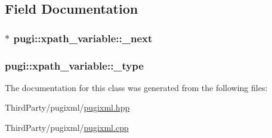 \subsection{Field Documentation}
\hypertarget{classpugi_1_1xpath__variable_a0979cb72473e77a1b6d213046abfc46e}{
\subsubsection[{\-\_\-next}]{$\ast$ pugi\-::xpath\-\_\-variable\-::\-\_\-next\hspace{0.3cm}{\ttfamily [protected]}}}\label{classpugi_1_1xpath__variable_a0979cb72473e77a1b6d213046abfc46e}
\hypertarget{classpugi_1_1xpath__variable_aefb30100ab8bf3cf2ba623dd6ffbbd35}{
\subsubsection[{\-\_\-type}]{ pugi\-::xpath\-\_\-variable\-::\-\_\-type\hspace{0.3cm}{\ttfamily [protected]}}}\label{classpugi_1_1xpath__variable_aefb30100ab8bf3cf2ba623dd6ffbbd35}


The documentation for this class was generated from the following files\-:\begin{DoxyCompactItemize}
\item 
Third\-Party/pugixml/\hyperlink{pugixml_8hpp}{pugixml.\-hpp}\item 
Third\-Party/pugixml/\hyperlink{pugixml_8cpp}{pugixml.\-cpp}\end{DoxyCompactItemize}

